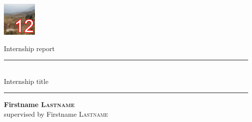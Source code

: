 \documentclass[11pt, a4paper]{article}
\begin{document}
\begin{task}
\begin{gridlayout}{\textwidth}{12cm}
\begin{row}{0.34}
\begin{cell}{0.25}
            \end{cell}
            \begin{cell}{0.25}
                \centering
                \includegraphics[width=0.9\cellwidth]{img/thumbnail-12.png}
            \end{cell}
        \end{row}
    \end{gridlayout}
\end{task}

\newpage







\newpage

\centering
Internship report

\vspace{3cm}

\rule{0.6\textwidth}{0.4pt}\\[1.5ex]
{\Large Internship title}\\
\rule{0.6\textwidth}{0.4pt}

\vspace{6cm}

\textbf{Firstname \textsc{Lastname}} \\
supervised by Firstname \textsc{Lastname}

\vfill
\end{document}
